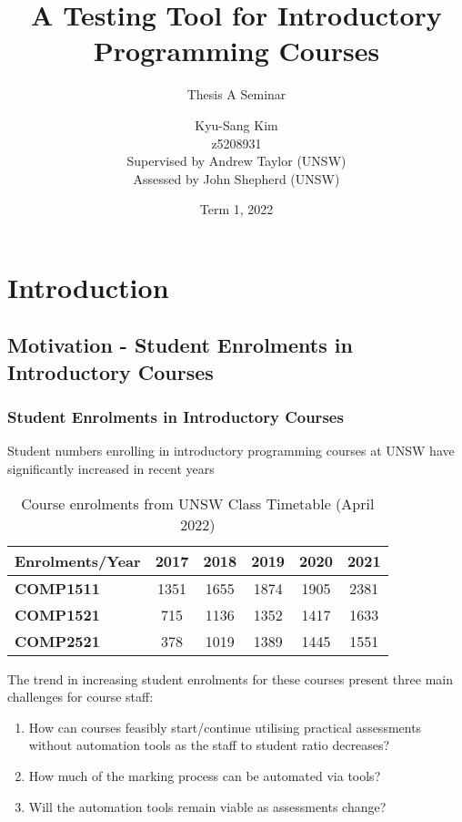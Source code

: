 \documentclass[xcolor]{beamer}
\author[Kyu-Sang Kim]{Kyu-Sang Kim\\z5208931\\\vspace{0.2cm}Supervised by Andrew Taylor (UNSW)\\Assessed by John Shepherd (UNSW)}
\title[Thesis A Seminar]{A Testing Tool for Introductory Programming Courses}
\subtitle{Thesis A Seminar}
\date{Term 1, 2022}
\begin{document}
\begin{frame}
	\titlepage
\end{frame}


\section{Introduction}
\subsection{Motivation - Student Enrolments in Introductory Courses}
\begin{frame}
	\frametitle{Student Enrolments in Introductory Courses}
	Student numbers enrolling in introductory programming courses at UNSW have significantly increased in recent years\\
		\pause
	\begin{table}[h!]
		\centering
		\begin{tabular}{|l|c|c|c|c|c|}
			\hline
			\textbf{Enrolments/Year} & \textbf{2017} & \textbf{2018} & \textbf{2019} & \textbf{2020} & \textbf{2021} \\ 
			\hline
			\textbf{COMP1511} & 1351 & 1655 & 1874 & 1905 & 2381\\ 
			\hline
			\textbf{COMP1521} & 715 & 1136 & 1352 & 1417 & 1633\\
			\hline
			\textbf{COMP2521} & 378 & 1019 & 1389 & 1445 & 1551\\
			\hline
		\end{tabular}
		\caption{Course enrolments from UNSW Class Timetable (April 2022)}
		\label{table:1}
		\vspace{-4mm}
	\end{table}
		\pause
	The trend in increasing student enrolments for these courses present three main challenges for course staff:\\
		\pause
	\begin{enumerate}
		\item How can courses feasibly start/continue utilising practical assessments without automation tools as the staff to student ratio decreases?
			\pause
		\item How much of the marking process can be automated via tools?
			\pause
		\item Will the automation tools remain viable as assessments change?
	\end{enumerate}
\end{frame}
\end{document}
